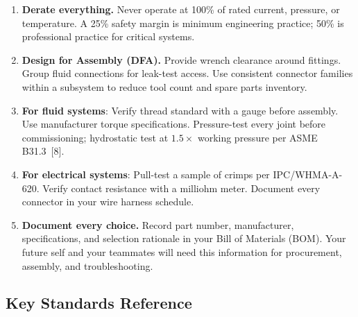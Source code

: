 \documentclass[11pt,letterpaper,twoside,openany]{book}
\begin{document}
\begin{enumerate}[leftmargin=1.5em]
  \item \textbf{Derate everything.} Never operate at 100\% of rated current, pressure, or temperature. A 25\% safety margin is minimum engineering practice; 50\% is professional practice for critical systems.

  \item \textbf{Design for Assembly (DFA).} Provide wrench clearance around fittings. Group fluid connections for leak-test access. Use consistent connector families within a subsystem to reduce tool count and spare parts inventory.

  \item \textbf{For fluid systems}: Verify thread standard with a gauge before assembly. Use manufacturer torque specifications. Pressure-test every joint before commissioning; hydrostatic test at $1.5\times$ working pressure per ASME B31.3~[8].

  \item \textbf{For electrical systems}: Pull-test a sample of crimps per IPC/WHMA-A-620. Verify contact resistance with a milliohm meter. Document every connector in your wire harness schedule.

  \item \textbf{Document every choice.} Record part number, manufacturer, specifications, and selection rationale in your Bill of Materials (BOM). Your future self and your teammates will need this information for procurement, assembly, and troubleshooting.
\end{enumerate}


\subsection{Key Standards Reference}
\end{document}
